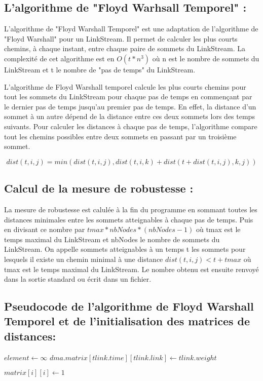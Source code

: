 \subsection{L'algorithme de "Floyd Warhsall Temporel" :}
L'algorithme de "Floyd Warshall Temporel" est une adaptation de l'algorithme de "Floyd Warshall" pour un LinkStream. 
Il permet de calculer les plus courts chemins, à chaque instant, entre chaque paire de sommets du LinkStream.
La complexité de cet algorithme est en $O(t*n^3)$ où n est le nombre de sommets du LinkStream et t le nombre de "pas de temps" du LinkStream.

L'algorithme de Floyd Warshall temporel calcule les plus courts chemins pour tout les sommets du LinkStream 
pour chaque pas de temps en commençant par le dernier pas de temps jusqu'au premier pas de temps.
En effet, la distance d'un sommet à un autre dépend de la distance entre ces deux sommets lors des temps suivants. 
Pour calculer les distances à chaque pas de temps, l'algorithme compare 
tout les chemins possibles entre deux sommets en passant par un troisième sommet. 

\begin{equation}
    dist(t,i,j) = min(dist(t,i,j), dist(t,i,k) + dist(t+ dist(t,i,j), k,j))
\end{equation}

\subsection{Calcul de la mesure de robustesse :}
La mesure de robustesse est calulée à la fin du programme en sommant toutes 
les distances minimales entre les sommets atteignables à chaque pas de temps. 
Puis en divisant ce nombre par $tmax * nbNodes * (nbNodes - 1)$ où tmax est le temps maximal du LinkStream et nbNodes le nombre de sommets du LinkStream.
On appelle sommets atteignables à un temps t les sommets pour lesquels il existe un chemin 
minimal à une distance 
$dist(t,i,j) < t + tmax$ où tmax est le temps maximal du LinkStream.
Le nombre obtenu est ensuite renvoyé dans la sortie standard ou écrit dans un fichier.
\subsection{Pseudocode de l'algorithme de Floyd Warshall Temporel et de l'initialisation des matrices de distances:}


\begin{algorithm}[H]
 \caption{$InitTFW(LinkStream \ lks, DistanceMatrixes \ dma$)}
    \begin{algorithmic}
        
   
			\State $element \gets \infty$
		\EndFor
	\EndFor
		\State $dma.matrix[tlink.time][tlink.link] \gets tlink.weight$ 
	\EndFor

			\State $matrix[i][i] \gets 1$
		\EndFor
	\EndFor
\end{algorithmic}
\end{algorithm}


